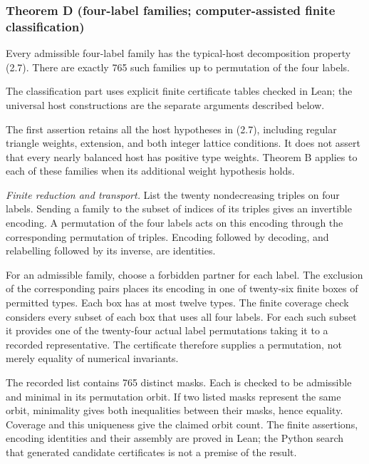 \documentclass[english,11pt,a4paper]{article}
\begin{document}
\subsubsection{Theorem D (four-label families; computer-assisted finite classification)}\label{theorem-d-four-label-families-computer-assisted-finite-classification}

Every admissible four-label family has the typical-host decomposition property (2.7). There are exactly 765 such families up to permutation of the four labels.

The classification part uses explicit finite certificate tables checked in Lean; the universal host constructions are the separate arguments described below.

The first assertion retains all the host hypotheses in (2.7), including regular triangle weights, extension, and both integer lattice conditions. It does not assert that every nearly balanced host has positive type weights. Theorem B applies to each of these families when its additional weight hypothesis holds.

\emph{Finite reduction and transport.} List the twenty nondecreasing triples on four labels. Sending a family to the subset of indices of its triples gives an invertible encoding. A permutation of the four labels acts on this encoding through the corresponding permutation of triples. Encoding followed by decoding, and relabelling followed by its inverse, are identities.

For an admissible family, choose a forbidden partner for each label. The exclusion of the corresponding pairs places its encoding in one of twenty-six finite boxes of permitted types. Each box has at most twelve types. The finite coverage check considers every subset of each box that uses all four labels. For each such subset it provides one of the twenty-four actual label permutations taking it to a recorded representative. The certificate therefore supplies a permutation, not merely equality of numerical invariants.

The recorded list contains 765 distinct masks. Each is checked to be admissible and minimal in its permutation orbit. If two listed masks represent the same orbit, minimality gives both inequalities between their masks, hence equality. Coverage and this uniqueness give the claimed orbit count. The finite assertions, encoding identities and their assembly are proved in Lean; the Python search that generated candidate certificates is not a premise of the result.
\end{document}
